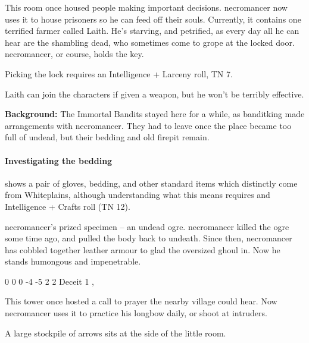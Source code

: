 \begin{multicols}{2}
\begin{itemize}
\end{itemize}


This room once housed people making important decisions.  \Gls{necromancer} now uses it to house prisoners so he can feed off their souls.
Currently, it contains one terrified farmer called Laith.
He's starving, and petrified, as every day all he can hear are the shambling dead, who sometimes come to grope at the locked door.
\Gls{necromancer}, or course, holds the key.

Picking the lock requires an Intelligence + Larceny roll, TN 7.

Laith can join the characters if given a weapon, but he won't be terribly effective.


\textbf{Background:}
The Immortal Bandits stayed here for a while, as \gls{banditking} made arrangements with \gls{necromancer}.
They had to leave once the place became too full of undead, but their bedding and old firepit remain.

\paragraph{Investigating the bedding}
shows a pair of gloves, bedding, and other standard items which distinctly come from Whiteplains, although understanding what this means requires and Intelligence + Crafts roll (TN 12).


\Gls{necromancer}'s prized specimen -- an undead ogre.
\Gls{necromancer} killed the ogre some time ago, and pulled the body back to undeath.
Since then, \gls{necromancer} has cobbled together leather armour to glad the oversized ghoul in.
Now he stands humongous and impenetrable.


{0}%
{0}%
{{0}%
{-4}%
{-5}}%
{2}%
{2}%
{Deceit 1}%
{\greatclub, \completeleather}%
{}%


This tower once hosted a call to prayer the nearby village could hear.
Now \gls{necromancer} uses it to practice his longbow daily, or shoot at intruders.

A large stockpile of arrows sits at the side of the little room.


\end{multicols}
